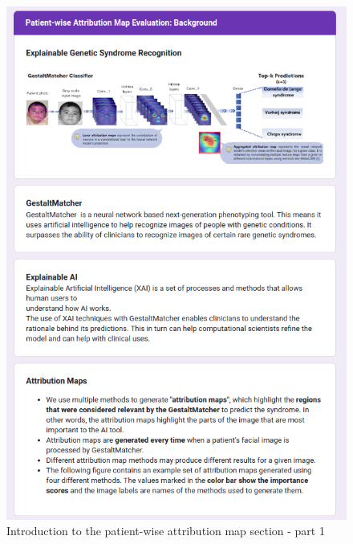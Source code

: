 \documentclass[../report.tex]{subfiles}
\begin{document}
	
		\begin{figure}[H]
			\centering
			\includegraphics[scale=0.55]{images/quest/4.png}
			\caption{Introduction to the patient-wise attribution map section - part 1}
		\end{figure}
\end{document}
